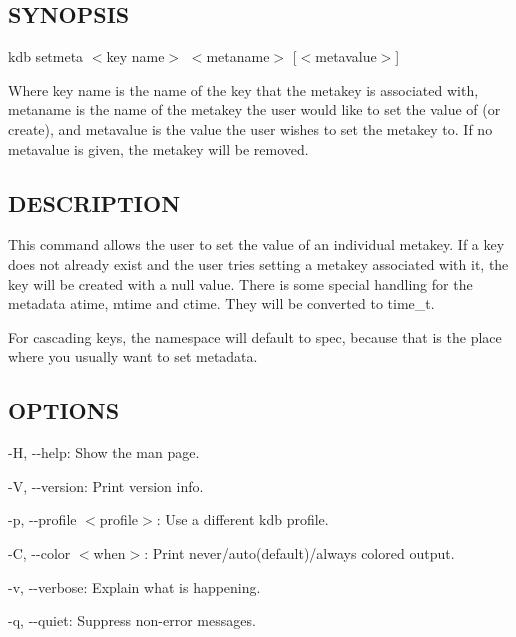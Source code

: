 \subsection*{S\+Y\+N\+O\+P\+S\+IS}

{\ttfamily kdb setmeta $<$key name$>$ $<$metaname$>$ \mbox{[}$<$metavalue$>$\mbox{]}}

Where {\ttfamily key name} is the name of the key that the metakey is associated with, {\ttfamily metaname} is the name of the metakey the user would like to set the value of (or create), and {\ttfamily metavalue} is the value the user wishes to set the metakey to. If no {\ttfamily metavalue} is given, the metakey will be removed.

\subsection*{D\+E\+S\+C\+R\+I\+P\+T\+I\+ON}

This command allows the user to set the value of an individual metakey. If a key does not already exist and the user tries setting a metakey associated with it, the key will be created with a null value. There is some special handling for the metadata atime, mtime and ctime. They will be converted to time\+\_\+t.

For cascading keys, the namespace will default to {\ttfamily spec}, because that is the place where you usually want to set metadata.

\subsection*{O\+P\+T\+I\+O\+NS}


\begin{DoxyItemize}
\item {\ttfamily -\/H}, {\ttfamily -\/-\/help}\+: Show the man page.
\item {\ttfamily -\/V}, {\ttfamily -\/-\/version}\+: Print version info.
\item {\ttfamily -\/p}, {\ttfamily -\/-\/profile $<$profile$>$}\+: Use a different kdb profile.
\item {\ttfamily -\/C}, {\ttfamily -\/-\/color $<$when$>$}\+: Print never/auto(default)/always colored output.
\item {\ttfamily -\/v}, {\ttfamily -\/-\/verbose}\+: Explain what is happening.
\item {\ttfamily -\/q}, {\ttfamily -\/-\/quiet}\+: Suppress non-\/error messages.
\end{DoxyItemize}

